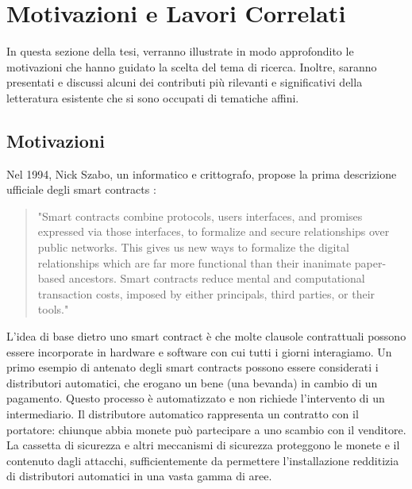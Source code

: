 \documentclass[../../Thesis.tex]{subfiles}
\begin{document}
\chapter{Motivazioni e Lavori Correlati}
In questa sezione della tesi, verranno illustrate in modo approfondito le motivazioni che hanno guidato la scelta del tema di ricerca. Inoltre, saranno presentati e discussi alcuni dei contributi più rilevanti e significativi della letteratura esistente che si sono occupati di tematiche affini.

\section{Motivazioni}
\label{ch:motivations}

Nel 1994, Nick Szabo, un informatico e crittografo, propose la prima descrizione ufficiale degli smart contracts \cite{Szabo_1997}:
 \begin{quotation}
    "Smart contracts combine protocols, users interfaces, and promises expressed via those interfaces, to formalize and secure relationships over public networks. This gives us new ways to formalize the digital relationships which are far more functional than their inanimate paper-based ancestors. Smart contracts reduce mental and computational transaction costs, imposed by either principals, third parties, or their tools."
 \end{quotation}
L'idea di base dietro uno smart contract è che molte clausole contrattuali possono essere incorporate in hardware e software con cui tutti i giorni interagiamo. Un primo esempio di antenato degli smart contracts possono essere considerati i distributori automatici, che erogano un bene (una bevanda) in cambio di un pagamento. Questo processo è automatizzato e non richiede l'intervento di un intermediario. Il distributore automatico rappresenta un contratto con il portatore: chiunque abbia monete può partecipare a uno scambio con il venditore. La cassetta di sicurezza e altri meccanismi di sicurezza proteggono le monete e il contenuto dagli attacchi, sufficientemente da permettere l'installazione redditizia di distributori automatici in una vasta gamma di aree.
\end{document}
